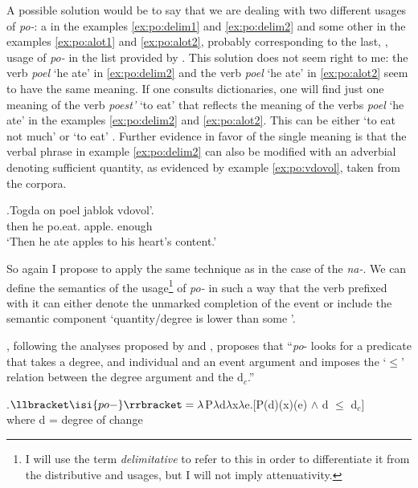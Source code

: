 A possible solution would be to say that we are dealing with two different usages of \textit{po-}: a  in the examples \ref{ex:po:delim1} and \ref{ex:po:delim2} and some other in the examples \ref{ex:po:alot1} and \ref{ex:po:alot2}, probably corresponding to the last, , usage of \textit{po-} in the list provided by \citet{Shvedova:82}. This solution does not seem right to me: the verb \textit{poel} `he ate' in \ref{ex:po:delim2} and the verb \textit{poel} `he ate' in \ref{ex:po:alot2} seem to have the same meaning. If one consults dictionaries, one will find just one meaning of the verb \textit{poest'} `to eat' that reflects the meaning of the verbs \textit{poel} `he ate' in the examples \ref{ex:po:delim2} and \ref{ex:po:alot2}. This can be either `to eat not much' \citep{Ushakov:50} or `to eat' \citep{Efremova:00}. Further evidence in favor of the single meaning is that the verbal phrase in example \ref{ex:po:delim2} can also be modified with an adverbial denoting sufficient quantity, as evidenced by example \ref{ex:po:vdovol}, taken from the corpora.

\exg.\label{ex:po:vdovol}Togda on poel jablok vdovol'.\\
then he po.eat. apple. enough\\
\trans `Then he ate apples to his heart's content.'\\

So again I propose to apply the same technique as in the case of the  \textit{na-}. We can define the semantics of the  usage\footnote{I will use the term \textit{delimitative} to refer to this in order to differentiate it from the distributive and  usages, but I will not imply attenuativity.} of \textit{po-} in such a way that the verb prefixed with it can either denote the unmarked completion of the event or include the semantic component `quantity/degree is lower than some '. 

\citet[48]{Kagan:book}, following the analyses proposed by \citet{Filip:00} and \citet{Souchkova:04}, proposes that ``\textit{po}- looks for a predicate that takes a degree, and individual and an event argument and imposes the `$\leqslant$' relation between the degree argument and the   d$_c$.''

\ex.\label{Kagan:po}$\llbracket \isi{po-} \rrbracket = \lambda$P$\lambda$d$\lambda$x$\lambda$e.[P(d)(x)(e) $\wedge$ d $\leqslant$ d$_c$]\\
where d = degree of change \citep{KennedyLevin:02}

